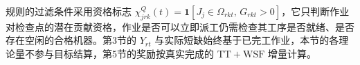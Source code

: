 \documentclass[12pt,a4paper]{article}
\theoremstyle{definition}
\begin{document}
规则的过滤条件采用资格标志 $\chi^{Q}_{jrk}(t)=\mathbf{1}[J_j\in\Omega_{rkt},\,G_{rkt}>0]$，它只判断作业对检查点的潜在贡献资格，作业是否可以立即派工仍需检查其工序是否就绪、是否存在空闲的合格机器。第3节的 $Y_{rt}$ 与实际短缺始终基于已完工作业，本节的各理论量不参与目标结算，第5节的奖励按真实完成的 $\mathrm{TT}+\mathrm{WSF}$ 增量计算。
\end{document}
